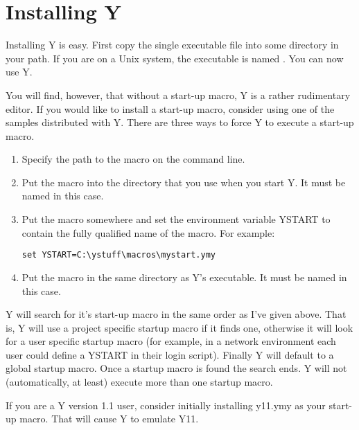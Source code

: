 \chapter{Installing Y}

Installing Y is easy. First copy the single executable file  into some directory
in your path. If you are on a Unix system, the executable is named . You can now
use Y.

You will find, however, that without a start-up macro, Y is a rather rudimentary editor. If you
would like to install a start-up macro, consider using one of the samples distributed with Y.
There are three ways to force Y to execute a start-up macro.

\begin{enumerate}

\item Specify the path to the macro on the command line.

\item Put the macro into the directory that you use when you start Y. It must be named
   in this case.

\item Put the macro somewhere and set the environment variable YSTART to contain the fully
  qualified name of the macro. For example:

\begin{verbatim}
set YSTART=C:\ystuff\macros\mystart.ymy
\end{verbatim}

\item Put the macro in the same directory as Y's executable. It must be named
   in this case.

\end{enumerate}

Y will search for it's start-up macro in the same order as I've given above. That is, Y will use
a project specific startup macro if it finds one, otherwise it will look for a user specific
startup macro (for example, in a network environment each user could define a YSTART in their
login script). Finally Y will default to a global startup macro. Once a startup macro is found
the search ends. Y will not (automatically, at least) execute more than one startup macro.

If you are a Y version 1.1 user, consider initially installing y11.ymy as your start-up macro.
That will cause Y to emulate Y11.
